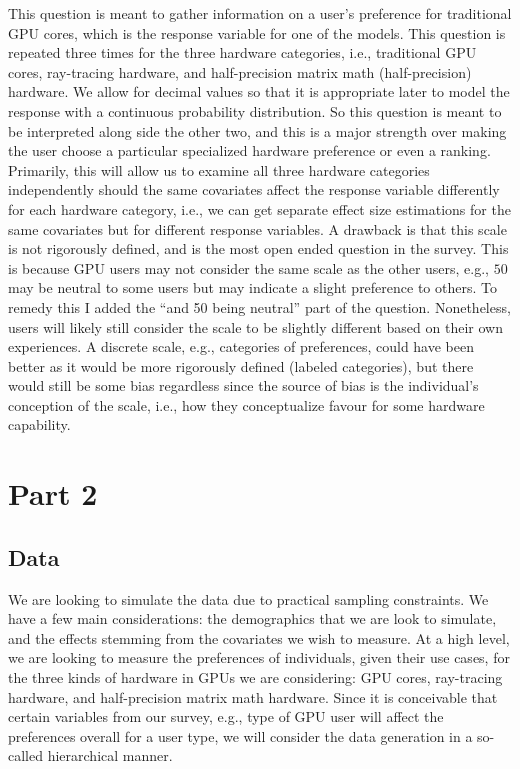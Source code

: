 \documentclass[
]{article}
\begin{document}
This question is meant to gather information on a user's preference for
traditional GPU cores, which is the response variable for one of the
models. This question is repeated three times for the three hardware
categories, i.e., traditional GPU cores, ray-tracing hardware, and
half-precision matrix math (half-precision) hardware. We allow for
decimal values so that it is appropriate later to model the response
with a continuous probability distribution. So this question is meant to
be interpreted along side the other two, and this is a major strength
over making the user choose a particular specialized hardware preference
or even a ranking. Primarily, this will allow us to examine all three
hardware categories independently should the same covariates affect the
response variable differently for each hardware category, i.e., we can
get separate effect size estimations for the same covariates but for
different response variables. A drawback is that this scale is not
rigorously defined, and is the most open ended question in the survey.
This is because GPU users may not consider the same scale as the other
users, e.g., \(50\) may be neutral to some users but may indicate a
slight preference to others. To remedy this I added the ``and 50 being
neutral'' part of the question. Nonetheless, users will likely still
consider the scale to be slightly different based on their own
experiences. A discrete scale, e.g., categories of preferences, could
have been better as it would be more rigorously defined (labeled
categories), but there would still be some bias regardless since the
source of bias is the individual's conception of the scale, i.e., how
they conceptualize favour for some hardware capability.

\newpage

\hypertarget{part-2}{%
\section{Part 2}\label{part-2}}

\hypertarget{data}{%
\subsection{Data}\label{data}}

We are looking to simulate the data due to practical sampling
constraints. We have a few main considerations: the demographics that we
are look to simulate, and the effects stemming from the covariates we
wish to measure. At a high level, we are looking to measure the
preferences of individuals, given their use cases, for the three kinds
of hardware in GPUs we are considering: GPU cores, ray-tracing hardware,
and half-precision matrix math hardware. Since it is conceivable that
certain variables from our survey, e.g., type of GPU user will affect
the preferences overall for a user type, we will consider the data
generation in a so-called hierarchical manner.
\end{document}
